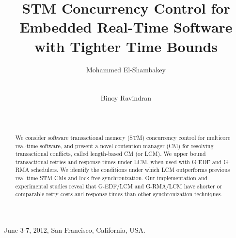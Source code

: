 \documentclass[letter]{sig-alternate}
\begin{document}
 {June 3-7, 2012, San Francisco, California, USA.}


\title{STM Concurrency Control for Embedded Real-Time Software with Tighter Time Bounds}



\author{
\alignauthor Mohammed El-Shambakey\\
\\
\\
\alignauthor Binoy Ravindran\\
\\
\\
}

\maketitle

\begin{abstract}
We consider software transactional memory (STM) concurrency control for multicore real-time software, and present a novel contention manager (CM) for resolving transactional conflicts, called length-based CM (or LCM). We upper bound transactional retries and response times under LCM, when used with G-EDF and  G-RMA schedulers. We identify the conditions under which LCM outperforms previous real-time STM CMs and lock-free synchronization. Our implementation and experimental studies reveal that G-EDF/LCM and G-RMA/LCM have shorter or comparable retry costs and response times than other synchronization techniques.
\end{abstract}

\end{document}
